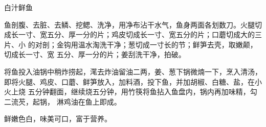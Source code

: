 %
%
%
%
%
%
%
\begin{recipe}{白汁鲜鱼}

\ingredients


\preparation

\step 鱼剖腹、去脏、去鳞、挖鳃、洗净，用净布沾干水气，鱼身两面各划数刀。火腿切
成长一寸、宽五分、厚一分的片；鸡皮切成长一寸、宽五分的片；口蘑切成大的三片、小
的对剖；金钩用温水淘洗干净；葱切成一寸长的节；鲜笋去壳，取嫩颠，切成长一寸、宽
五分、厚一分的片；姜刮洗干净，拍破。

\step 将鱼投入油锅中稍炸捞起，滗去炸油留油二两，姜、葱下锅微煵一下，烹入清汤，
即将火腿、鸡皮、口蘑、鲜笋放入，加料酒，投下鱼，并加胡椒、白糖、盐，在小火上烧
五分钟翻面，继续烧五分钟，用竹筷将鱼拈入鱼盘内，锅内再加味精，勾二流芡，起锅，
淋鸡油在鱼上即成。

\features

鲜嫩色白，味美可口，富于营养。

\end{recipe}

